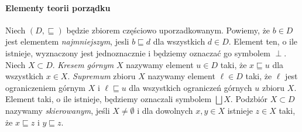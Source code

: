 


\paragraph{Elementy teorii porządku} 
Niech \((D,\sqsubseteq)\) będzie zbiorem częściowo uporzadkowanym. Powiemy, że \(b\in D\) jest elementem \emph{najmniejszym}, jesli \(b\sqsubseteq d\) dla wszystkich \(d\in D\). Element ten, o ile istnieje, wyznaczony jest jednoznacznie i będziemy oznaczać go symbolem \(\perp\). Niech \(X\subset D\). \emph{Kresem górnym} \(X\) nazywamy element \(u\in D\) taki, że \(x\sqsubseteq u\) dla wszystkich \(x\in X\). \emph{Supremum} zbioru \(X\) nazywamy element \(\ell\in D\) taki, że \(\ell\) jest ograniczeniem górnym \(X\) i \(\ell\sqsubseteq u\) dla wszystkich ograniczeń górnych \(u\) zbioru \(X\). Element taki, o ile istnieje, będziemy oznaczali symbolem \(\bigsqcup X\). Podzbiór \(X\subset D\) nazywamy \emph{skierowanym}, jeśli \(X\neq\emptyset\) i dla dowolnych \(x, y\in X\) istnieje \(z\in X\) taki, że \(x\sqsubseteq z\) i \(y\sqsubseteq z\). 

